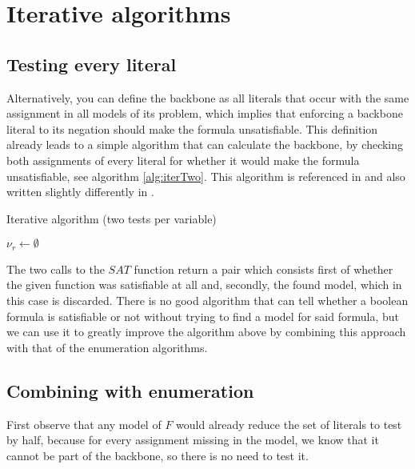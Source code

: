 \section{Iterative algorithms}
\label{sec:iterative}
\subsection{Testing every literal}
Alternatively, you can define the backbone as all literals that occur with the same assignment in all models of its problem, which implies that enforcing a backbone literal to its negation should make the formula unsatisfiable. This definition already leads to a simple algorithm that can calculate the backbone, by checking both assignments of every literal for whether it would make the formula unsatisfiable, see algorithm \ref{alg:iterTwo}. This algorithm is referenced in \cite{mjl10} and also written slightly differently in \cite{kk01}.
\begin{algorithm}
\caption{{\sc Iterative algorithm (two tests per variable)}}
\label{alg:iterTwo}
\DontPrintSemicolon
{}
$\nu_r \gets \emptyset$\;
\;
\end{algorithm}

The two calls to the $SAT$ function return a pair which consists first of whether the given function was satisfiable at all and, secondly, the found model, which in this case is discarded. There is no good algorithm that can tell whether a boolean formula is satisfiable or not without trying to find a model for said formula, but we can use it to greatly improve the algorithm above by combining this approach with that of the enumeration algorithms.

\subsection{Combining with enumeration}
First observe that any model of $F$ would already reduce the set of literals to test by half, because for every assignment missing in the model, we know that it cannot be part of the backbone, so there is no need to test it. 

